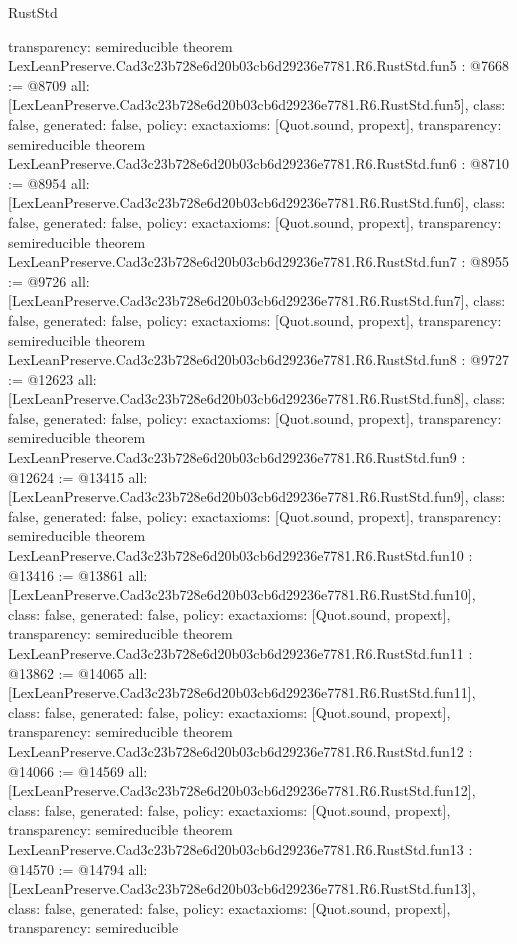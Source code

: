 \begin{lexlean}{RustStd}
\begin{coremodule}
{  transparency: semireducible
}
theorem LexLeanPreserve.Cad3c23b728e6d20b03cb6d29236e7781.R6.RustStd.fun5 : @7668 := @8709 {
  all: [LexLeanPreserve.Cad3c23b728e6d20b03cb6d29236e7781.R6.RustStd.fun5],
  class: false,
  generated: false,
  policy: exact{axioms: [Quot.sound, propext]},
  transparency: semireducible
}
theorem LexLeanPreserve.Cad3c23b728e6d20b03cb6d29236e7781.R6.RustStd.fun6 : @8710 := @8954 {
  all: [LexLeanPreserve.Cad3c23b728e6d20b03cb6d29236e7781.R6.RustStd.fun6],
  class: false,
  generated: false,
  policy: exact{axioms: [Quot.sound, propext]},
  transparency: semireducible
}
theorem LexLeanPreserve.Cad3c23b728e6d20b03cb6d29236e7781.R6.RustStd.fun7 : @8955 := @9726 {
  all: [LexLeanPreserve.Cad3c23b728e6d20b03cb6d29236e7781.R6.RustStd.fun7],
  class: false,
  generated: false,
  policy: exact{axioms: [Quot.sound, propext]},
  transparency: semireducible
}
theorem LexLeanPreserve.Cad3c23b728e6d20b03cb6d29236e7781.R6.RustStd.fun8 : @9727 := @12623 {
  all: [LexLeanPreserve.Cad3c23b728e6d20b03cb6d29236e7781.R6.RustStd.fun8],
  class: false,
  generated: false,
  policy: exact{axioms: [Quot.sound, propext]},
  transparency: semireducible
}
theorem LexLeanPreserve.Cad3c23b728e6d20b03cb6d29236e7781.R6.RustStd.fun9 : @12624 := @13415 {
  all: [LexLeanPreserve.Cad3c23b728e6d20b03cb6d29236e7781.R6.RustStd.fun9],
  class: false,
  generated: false,
  policy: exact{axioms: [Quot.sound, propext]},
  transparency: semireducible
}
theorem LexLeanPreserve.Cad3c23b728e6d20b03cb6d29236e7781.R6.RustStd.fun10 : @13416 := @13861 {
  all: [LexLeanPreserve.Cad3c23b728e6d20b03cb6d29236e7781.R6.RustStd.fun10],
  class: false,
  generated: false,
  policy: exact{axioms: [Quot.sound, propext]},
  transparency: semireducible
}
theorem LexLeanPreserve.Cad3c23b728e6d20b03cb6d29236e7781.R6.RustStd.fun11 : @13862 := @14065 {
  all: [LexLeanPreserve.Cad3c23b728e6d20b03cb6d29236e7781.R6.RustStd.fun11],
  class: false,
  generated: false,
  policy: exact{axioms: [Quot.sound, propext]},
  transparency: semireducible
}
theorem LexLeanPreserve.Cad3c23b728e6d20b03cb6d29236e7781.R6.RustStd.fun12 : @14066 := @14569 {
  all: [LexLeanPreserve.Cad3c23b728e6d20b03cb6d29236e7781.R6.RustStd.fun12],
  class: false,
  generated: false,
  policy: exact{axioms: [Quot.sound, propext]},
  transparency: semireducible
}
theorem LexLeanPreserve.Cad3c23b728e6d20b03cb6d29236e7781.R6.RustStd.fun13 : @14570 := @14794 {
  all: [LexLeanPreserve.Cad3c23b728e6d20b03cb6d29236e7781.R6.RustStd.fun13],
  class: false,
  generated: false,
  policy: exact{axioms: [Quot.sound, propext]},
  transparency: semireducible
}
\end{coremodule}
\end{lexlean}
